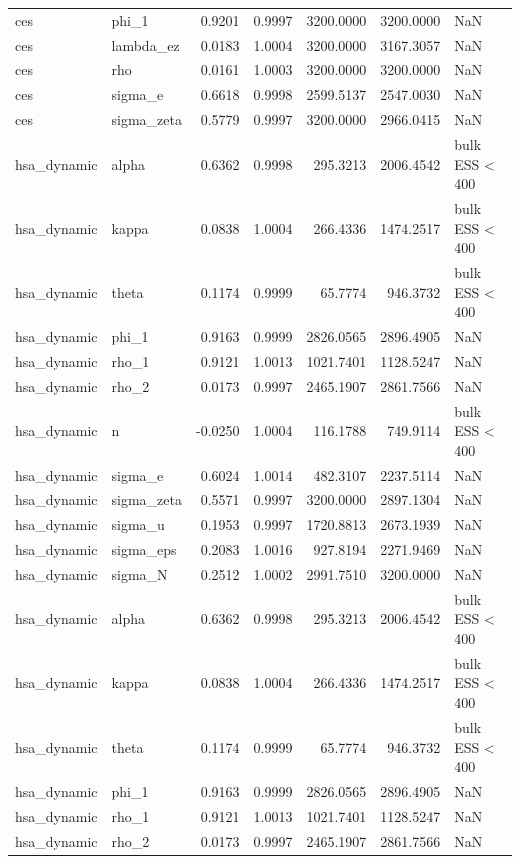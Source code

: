 \begin{tabular}{llrrrrl}
ces & phi\_1 & 0.9201 & 0.9997 & 3200.0000 & 3200.0000 & NaN \\
ces & lambda\_ez & 0.0183 & 1.0004 & 3200.0000 & 3167.3057 & NaN \\
ces & rho & 0.0161 & 1.0003 & 3200.0000 & 3200.0000 & NaN \\
ces & sigma\_e & 0.6618 & 0.9998 & 2599.5137 & 2547.0030 & NaN \\
ces & sigma\_zeta & 0.5779 & 0.9997 & 3200.0000 & 2966.0415 & NaN \\
hsa\_dynamic & alpha & 0.6362 & 0.9998 & 295.3213 & 2006.4542 & bulk ESS < 400 \\
hsa\_dynamic & kappa & 0.0838 & 1.0004 & 266.4336 & 1474.2517 & bulk ESS < 400 \\
hsa\_dynamic & theta & 0.1174 & 0.9999 & 65.7774 & 946.3732 & bulk ESS < 400 \\
hsa\_dynamic & phi\_1 & 0.9163 & 0.9999 & 2826.0565 & 2896.4905 & NaN \\
hsa\_dynamic & rho\_1 & 0.9121 & 1.0013 & 1021.7401 & 1128.5247 & NaN \\
hsa\_dynamic & rho\_2 & 0.0173 & 0.9997 & 2465.1907 & 2861.7566 & NaN \\
hsa\_dynamic & n & -0.0250 & 1.0004 & 116.1788 & 749.9114 & bulk ESS < 400 \\
hsa\_dynamic & sigma\_e & 0.6024 & 1.0014 & 482.3107 & 2237.5114 & NaN \\
hsa\_dynamic & sigma\_zeta & 0.5571 & 0.9997 & 3200.0000 & 2897.1304 & NaN \\
hsa\_dynamic & sigma\_u & 0.1953 & 0.9997 & 1720.8813 & 2673.1939 & NaN \\
hsa\_dynamic & sigma\_eps & 0.2083 & 1.0016 & 927.8194 & 2271.9469 & NaN \\
hsa\_dynamic & sigma\_N & 0.2512 & 1.0002 & 2991.7510 & 3200.0000 & NaN \\
hsa\_dynamic & alpha & 0.6362 & 0.9998 & 295.3213 & 2006.4542 & bulk ESS < 400 \\
hsa\_dynamic & kappa & 0.0838 & 1.0004 & 266.4336 & 1474.2517 & bulk ESS < 400 \\
hsa\_dynamic & theta & 0.1174 & 0.9999 & 65.7774 & 946.3732 & bulk ESS < 400 \\
hsa\_dynamic & phi\_1 & 0.9163 & 0.9999 & 2826.0565 & 2896.4905 & NaN \\
hsa\_dynamic & rho\_1 & 0.9121 & 1.0013 & 1021.7401 & 1128.5247 & NaN \\
hsa\_dynamic & rho\_2 & 0.0173 & 0.9997 & 2465.1907 & 2861.7566 & NaN \\

\end{tabular}

